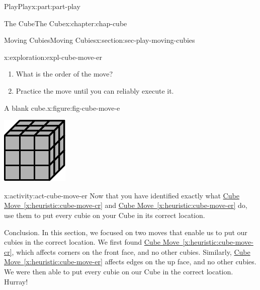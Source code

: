 \documentclass[oneside,10pt,]{book}
\newcommand{\xreffont}{\relax}
\numberwithin{equation}{section}
\begin{document}
\begin{partptx}{Play}{}{Play}{}{}{x:part:part-play}
\begin{chapterptx}{The Cube}{}{The Cube}{}{}{x:chapter:chap-cube}
\begin{sectionptx}{Moving Cubies}{}{Moving Cubies}{}{}{x:section:sec-play-moving-cubies}
\begin{exploration}{}{x:exploration:expl-cube-move-er}
\begin{enumerate}
\item{}What is the order of the move?%
\item{}Practice the move until you can reliably execute it.%
\end{enumerate}
\begin{figureptx}{A blank cube.}{x:figure:fig-cube-move-e}{}%
\begin{image}{0.25}{0.5}{0.25}%
\includegraphics[width=\linewidth]{./images/grey_cube.pdf}
\end{image}%
\tcblower
\end{figureptx}%
\end{exploration}%
\begin{activity}{}{x:activity:act-cube-move-er}%
Now that you have identified exactly what \hyperref[x:heuristic:cube-move-cr]{Cube Move~{\xreffont\ref{x:heuristic:cube-move-cr}}} and \hyperref[x:heuristic:cube-move-er]{Cube Move~{\xreffont\ref{x:heuristic:cube-move-er}}} do, use them to put every cubie on your Cube in its correct location.%
\end{activity}%
\begin{conclusion}{Conclusion.}%
In this section, we focused on two moves that enable us to put our cubies in the correct location. We first found \hyperref[x:heuristic:cube-move-cr]{Cube Move~{\xreffont\ref{x:heuristic:cube-move-cr}}}, which affects corners on the front face, and no other cubies. Similarly, \hyperref[x:heuristic:cube-move-er]{Cube Move~{\xreffont\ref{x:heuristic:cube-move-er}}} affects edges on the up face, and no other cubies. We were then able to put every cubie on our Cube in the correct location. Hurray!%

\end{conclusion}
\end{sectionptx}
\end{chapterptx}
\end{partptx}
\end{document}
